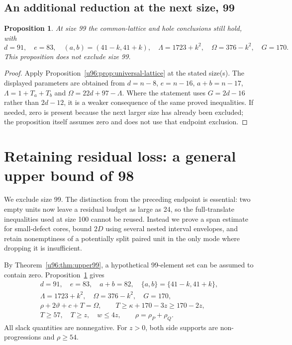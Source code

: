 \documentclass[11pt,a4paper]{article}
\newtheorem{proposition}[theorem]{Proposition}
\theoremstyle{remark}
\begin{document}
\subsection{An additional reduction at the next size, 99}
\begin{proposition}\label{u96:prop:lattice99}
At size 99 the common-lattice and hole conclusions still hold, with
\[
 d=91,\quad e=83,\quad(a,b)=(41-k,41+k),\quad
 \Lambda=1723+k^2,\quad\Omega=376-k^2,\quad G=170.
\]
This proposition does not exclude size 99.
\end{proposition}
\begin{proof}
Apply Proposition~\ref{u96:prop:universal-lattice} at the stated size(s).
The displayed parameters are obtained from $d=n-8$, $e=n-16$,
$a+b=n-17$, $\Lambda=1+T_a+T_b$ and $\Omega=22d+97-\Lambda$.
Where the statement uses $G=2d-16$ rather than $2d-12$, it is a weaker
consequence of the same proved inequalities. If needed, zero is present
because the next larger size has already been excluded; the proposition
itself assumes zero and does not use that endpoint exclusion.
\end{proof}

\section{Retaining residual loss: a general upper bound of 98}\label{u96:sec:upper98}
We exclude size 99. The distinction from the preceding endpoint
is essential: two empty units now leave a residual budget as large as 24,
so the full-translate inequalities used at size 100 cannot be reused.
Instead we prove a span estimate for small-defect cores, bound $2D$ using
several nested interval envelopes, and retain nonemptiness of a potentially
split paired unit in the only mode where dropping it is insufficient.

By Theorem~\ref{u96:thm:upper99}, a hypothetical 99-element set can be assumed
to contain zero. Proposition~\ref{u96:prop:lattice99} gives
\begin{equation}
\begin{gathered}
 d=91,\quad e=83,\quad a+b=82,\quad \{a,b\}=\{41-k,41+k\},\\
 \Lambda=1723+k^2,\quad\Omega=376-k^2,\quad G=170,\\
 \rho+2\vartheta+c+T=\Omega,\qquad
 T\geq\kappa+170-3z\geq170-2z,\\
 T\geq57,\quad T\geq z,\quad w\leq4z,
 \qquad\rho=\rho_P+\rho_Q.
\end{gathered}\label{u96:eq:98-budget}
\end{equation}
All slack quantities are nonnegative. For $z>0$, both side supports are
non-progressions and $\rho\geq54$.
\end{document}
